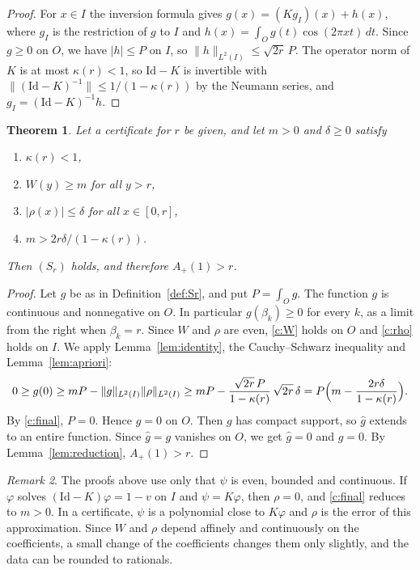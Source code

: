 \documentclass[11pt]{amsart}
\newtheorem{theorem}{Theorem}[section]
\theoremstyle{definition}
\theoremstyle{remark}
\newtheorem{remark}[theorem]{Remark}
\numberwithin{equation}{section}
\newcommand{\Id}{\mathrm{Id}}
\newcommand{\ft}[1]{\widehat{#1}}
\newcommand{\Ap}{A_+(1)}
\begin{document}
\begin{proof}
For $x\in I$ the inversion formula gives $g(x)=(Kg_I)(x)+h(x)$, where $g_I$ is the restriction of $g$ to $I$ and $h(x)=\int_Og(t)\cos(2\pi xt)\,dt$. Since $g\ge0$ on $O$, we have $|h|\le P$ on $I$, so $\|h\|_{L^2(I)}\le\sqrt{2r}\,P$. The operator norm of $K$ is at most $\kappa(r)<1$, so $\Id-K$ is invertible with $\|(\Id-K)^{-1}\|\le1/(1-\kappa(r))$ by the Neumann series, and $g_I=(\Id-K)^{-1}h$.
\end{proof}

\begin{theorem}\label{thm:criterion}
Let a certificate for $r$ be given, and let $m>0$ and $\delta\ge0$ satisfy
\begin{enumerate}[label=\textup{(\roman*)}]
\item\label{c:kappa} $\kappa(r)<1$,
\item\label{c:W} $W(y)\ge m$ for all $y>r$,
\item\label{c:rho} $|\rho(x)|\le\delta$ for all $x\in[0,r]$,
\item\label{c:final} $m>2r\delta/(1-\kappa(r))$.
\end{enumerate}
Then $(S_r)$ holds, and therefore $\Ap>r$.
\end{theorem}

\begin{proof}
Let $g$ be as in Definition~\ref{def:Sr}, and put $P=\int_Og$. The function $g$ is continuous and nonnegative on $O$. In particular $g(\beta_k)\ge0$ for every $k$, as a limit from the right when $\beta_k=r$. Since $W$ and $\rho$ are even, \ref{c:W} holds on $O$ and \ref{c:rho} holds on $I$. We apply Lemma~\ref{lem:identity}, the Cauchy--Schwarz inequality and Lemma~\ref{lem:apriori}:
\[
0\ge g(0)\ge mP-\|g\|_{L^2(I)}\|\rho\|_{L^2(I)}\ge mP-\frac{\sqrt{2r}\,P}{1-\kappa(r)}\,\sqrt{2r}\,\delta=P\Bigl(m-\frac{2r\delta}{1-\kappa(r)}\Bigr).
\]
By \ref{c:final}, $P=0$. Hence $g=0$ on $O$. Then $g$ has compact support, so $\ft g$ extends to an entire function. Since $\ft g=g$ vanishes on $O$, we get $\ft g=0$ and $g=0$. By Lemma~\ref{lem:reduction}, $\Ap>r$.
\end{proof}

\begin{remark}\label{rem:exact}
The proofs above use only that $\psi$ is even, bounded and continuous. If $\varphi$ solves $(\Id-K)\varphi=1-v$ on $I$ and $\psi=K\varphi$, then $\rho=0$, and \ref{c:final} reduces to $m>0$. In a certificate, $\psi$ is a polynomial close to $K\varphi$ and $\rho$ is the error of this approximation. Since $W$ and $\rho$ depend affinely and continuously on the coefficients, a small change of the coefficients changes them only slightly, and the data can be rounded to rationals.
\end{remark}
\end{document}
